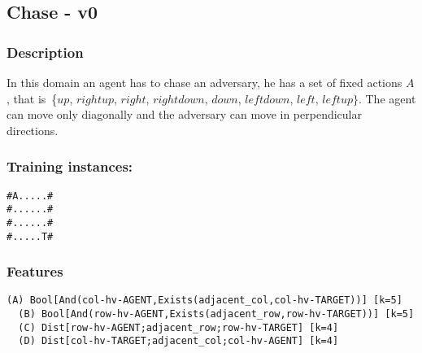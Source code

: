 \documentclass[a4paper]{article}
\begin{document}




\subsection{Chase - v0}
\subsubsection{Description}
In this domain an agent has to chase an adversary, he has a set of fixed actions $A$, that is~\{$up$, $rightup$, $right$, $rightdown$, $down$, $leftdown$, $left$, $leftup\}$. The agent can move only diagonally and the adversary can move in perpendicular directions.

\subsubsection{Training instances:}
\begin{Verbatim}[fontsize=\footnotesize]
#A.....#
#......#
#......#
#.....T#
\end{Verbatim}

\subsubsection{Features}
\begin{Verbatim}[fontsize=\footnotesize]
  (A) Bool[And(col-hv-AGENT,Exists(adjacent_col,col-hv-TARGET))] [k=5]
  (B) Bool[And(row-hv-AGENT,Exists(adjacent_row,row-hv-TARGET))] [k=5]
  (C) Dist[row-hv-AGENT;adjacent_row;row-hv-TARGET] [k=4]
  (D) Dist[col-hv-TARGET;adjacent_col;col-hv-AGENT] [k=4]
\end{Verbatim}
\end{document}
